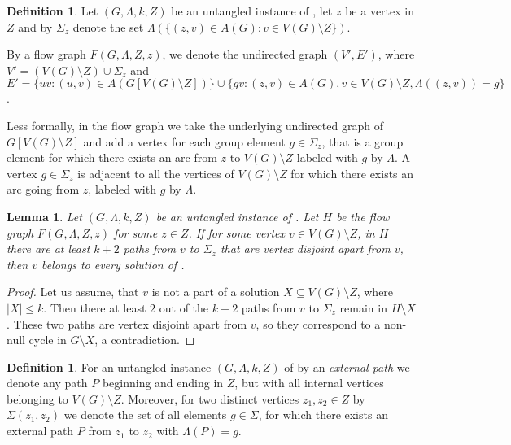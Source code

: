 \documentclass[11pt]{article}
\newtheorem{lemma}[theorem]{Lemma}
\theoremstyle{definition}
\newtheorem{definition}[theorem]{Definition}
\newcommand{\cgfvsshort}{{\sc{C-GFVS}}\xspace}
\begin{document}
\begin{definition}
Let $(G,\Lambda,k,Z)$ be an untangled instance of \cgfvsshort,
let $z$ be a vertex in $Z$ and by $\Sigma_z$ denote 
the set $\Lambda(\{(z,v) \in A(G) : v \in V(G) \setminus Z\})$.

By a flow graph $F(G,\Lambda,Z,z)$, we denote the undirected
graph $(V',E')$, where $V' = (V(G) \setminus Z) \cup \Sigma_z$
and $E' = \{uv : (u,v) \in A(G[V(G) \setminus Z])\} \cup \{gv : (z,v) \in A(G), v \in V(G) \setminus Z, \Lambda((z,v)) = g\}$.
\end{definition}

Less formally, in the flow graph we take the underlying undirected graph of $G[V(G) \setminus Z]$
and add a vertex for each group element $g \in \Sigma_z$, 
that is a group element for which there exists an arc from $z$ to $V(G) \setminus Z$ 
labeled with $g$ by $\Lambda$.
A vertex $g \in \Sigma_z$ is adjacent to all the vertices of $V(G) \setminus Z$
for which there exists an arc going from $z$, labeled with $g$ by $\Lambda$.


\begin{lemma}
\label{red:1}
Let $(G,\Lambda,k,Z)$ be an untangled instance of \cgfvsshort.
Let $H$ be the flow graph $F(G,\Lambda,Z,z)$ for some $z \in Z$.
If for some vertex $v \in V(G)\setminus Z$, 
in $H$ there are at least $k+2$ paths from $v$ to $\Sigma_z$ that are vertex disjoint apart from $v$,
then $v$ belongs to every solution of \cgfvsshort.
\end{lemma}

\begin{proof}
Let us assume, that $v$ is not a part of a solution $X \subseteq V(G)\setminus Z$,
where $|X| \le k$.
Then there at least $2$ out of the $k+2$ paths from $v$ to $\Sigma_z$ remain in $H \setminus X$.
These two paths are vertex disjoint apart from $v$, so they correspond to a non-null cycle in $G\setminus X$, a contradiction.
\end{proof}

\begin{definition}
For an untangled instance $(G,\Lambda,k,Z)$ of \cgfvsshort by an {\em external path}
we denote any path $P$ beginning and ending in $Z$, but with all internal vertices belonging to $V(G)\setminus Z$.
Moreover, for two distinct vertices $z_1,z_2 \in Z$ by $\Sigma(z_1,z_2)$ we denote the set of all elements $g \in \Sigma$,
for which there exists an external path $P$ from $z_1$ to $z_2$ with $\Lambda(P)=g$.
\end{definition}
\end{document}
